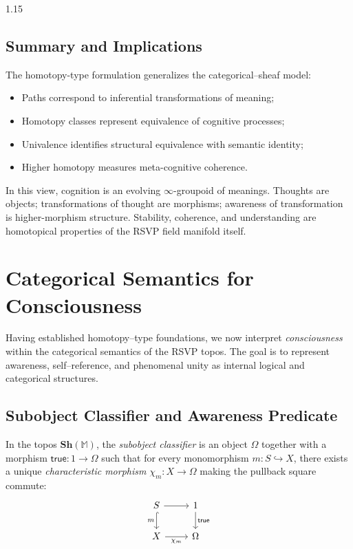 \documentclass[12pt,a4paper]{article}
\begin{document}
\begin{spacing}{1.15}
\subsection{Summary and Implications}

The homotopy-type formulation generalizes the categorical–sheaf model:
\begin{itemize}[leftmargin=1.2em]
  \item Paths correspond to inferential transformations of meaning;
  \item Homotopy classes represent equivalence of cognitive processes;
  \item Univalence identifies structural equivalence with semantic identity;
  \item Higher homotopy measures meta-cognitive coherence.
\end{itemize}

In this view, cognition is an evolving \(\infty\)-groupoid of meanings.
Thoughts are objects; transformations of thought are morphisms;
awareness of transformation is higher-morphism structure.
Stability, coherence, and understanding
are homotopical properties of the RSVP field manifold itself.

\section{Categorical Semantics for Consciousness}
\label{app:consciousness}

Having established homotopy–type foundations,
we now interpret \emph{consciousness} within the categorical semantics
of the RSVP topos.
The goal is to represent awareness, self–reference, and phenomenal unity
as internal logical and categorical structures.

\subsection{Subobject Classifier and Awareness Predicate}

\begin{definition}
\label{def:omega}
In the topos \(\mathbf{Sh}(\mathbb{M})\),
the \emph{subobject classifier} is an object
\(\Omega\) together with a morphism
\(\mathsf{true} : 1 \to \Omega\)
such that for every monomorphism
\(m:S \hookrightarrow X\),
there exists a unique \emph{characteristic morphism}
\(\chi_m : X \to \Omega\)
making the pullback square commute:
\[
\begin{tikzcd}
S \arrow[d,hook,"m"'] \arrow[r] & 1 \arrow[d,"\mathsf{true}"] \\
X \arrow[r,"\chi_m"'] & \Omega
\end{tikzcd}
\]
\end{definition}


\end{spacing}
\end{document}
